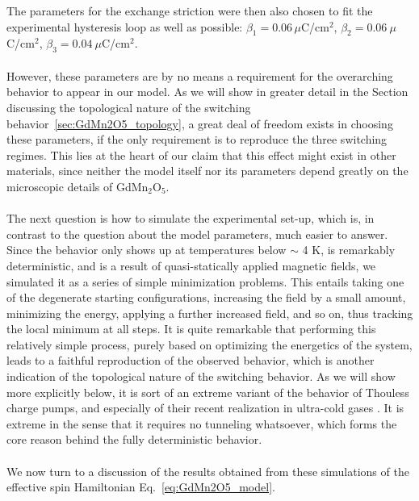 The parameters for the exchange striction were then also chosen to fit the experimental hysteresis loop as well as possible:
${\beta_1 = 0.06\,\mu}$C/cm$^2$, $\beta_2 = 0.06\:\mu$C/cm$^2$, $\beta_3 = 0.04\:\mu$C/cm$^2$.
\\\\
However, these parameters are by no means a requirement for the overarching behavior to appear in our model. As we will show in greater detail in the Section discussing the topological nature of the switching behavior~\ref{sec:GdMn2O5_topology}, a great deal of freedom exists in choosing these parameters, if the only requirement is to reproduce the three switching regimes.
This lies at the heart of our claim that this effect might exist in other materials, since neither the model itself nor its parameters depend greatly on the microscopic details of GdMn$_2$O$_5$. 
\\\\
The next question is how to simulate the experimental set-up, which is, in contrast to the question about the model parameters, much easier to answer.
Since the behavior only shows up at temperatures below $\sim$ 4 K, is remarkably deterministic, and is a result of quasi-statically applied magnetic fields, we simulated it as a series of simple minimization problems.
This entails taking one of the degenerate starting configurations, increasing the field by a small amount, minimizing the energy, applying a further increased field, and so on, thus tracking the local minimum at all steps.
It is quite remarkable that performing this relatively simple process, purely based on optimizing the energetics of the system, leads to a faithful reproduction of the observed behavior, which is another indication of the topological nature of the switching behavior.
As we will show more explicitly below, it is sort of an extreme variant of the behavior of Thouless charge pumps, and especially of their recent realization in ultra-cold gases \cite{Rice82,Thouless1982,Thouless83,Lohse16,Nakajima16, Atala13}.
It is extreme in the sense that it requires no tunneling whatsoever, which forms the core reason behind the fully deterministic behavior.
\\\\

We now turn to a discussion of the results obtained from these simulations of the effective spin Hamiltonian Eq.~\eqref{eq:GdMn2O5_model}.

